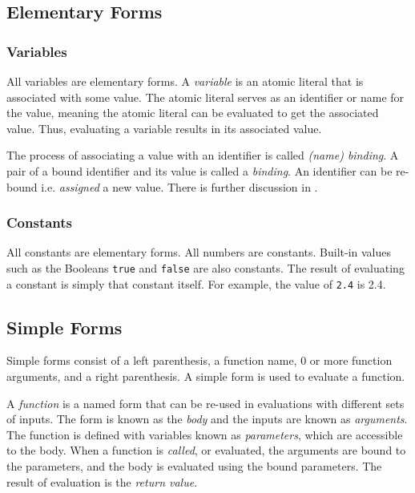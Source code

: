 \documentclass[a4paper, 12pt]{article}
\begin{document}
\subsection{Elementary Forms}
\subsubsection{Variables}
All variables are elementary forms. A \textit{variable} is an atomic literal that is associated with some value. The atomic literal serves as an identifier or name for the value, meaning the atomic literal can be evaluated to get the associated value. Thus, evaluating a variable results in its associated value.

The process of associating a value with an identifier is called \textit{(name) binding}. A pair of a bound identifier and its value is called a \textit{binding}. An identifier can be re-bound i.e. \textit{assigned} a new value. There is further discussion in .

\subsubsection{Constants}
All constants are elementary forms. All numbers are constants. Built-in values such as the Booleans \texttt{true} and \texttt{false} are also constants. The result of evaluating a constant is simply that constant itself. For example, the value of \texttt{2.4} is 2.4.

\subsection{Simple Forms}\label{subsubsec:simpleforms}
Simple forms consist of a left parenthesis, a function name, 0 or more function arguments, and a right parenthesis. A simple form is used to evaluate a function.

A \textit{function} is a named form that can be re-used in evaluations with different sets of inputs. The form is known as the \textit{body} and the inputs are known as \textit{arguments}. The function is defined with variables known as \textit{parameters}, which are accessible to the body. When a function is \textit{called}, or evaluated, the arguments are bound to the parameters, and the body is evaluated using the bound parameters. The result of evaluation is the \textit{return value}.
\end{document}
